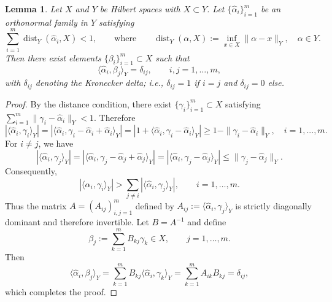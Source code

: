 \documentclass{article}
\numberwithin{equation}{section}
\newtheorem{lemma}{Lemma}[section]
\begin{document}
\begin{lemma}\label{lemma:orthocond}
Let $X$ and $Y$ be Hilbert spaces with $X\subset Y$. Let $\{\hat{\alpha}_i\}_{i=1}^m$ be an orthonormal family in $Y$ satisfying
\begin{equation}
\sum_{i=1}^m \operatorname{dist}_Y(\hat{\alpha}_i,X)<1,
\qquad\text{where}\qquad 
\operatorname{dist}_Y(\alpha,X):=\inf_{x\in X}\|\alpha-x\|_Y,\quad \alpha\in Y.
\end{equation}
Then there exist elements $\{\beta_i\}_{i=1}^m\subset X$ such that
\begin{equation}\label{equa:orthocod2}
\langle \hat{\alpha}_i,\beta_j\rangle_Y=\delta_{ij},\qquad i,j=1,\dots,m,
\end{equation}
with $\delta_{ij}$ denoting the Kronecker delta; i.e., $\delta_{ij}=1$ if $i=j$ and $\delta_{ij}=0$ else.
\end{lemma}

\begin{proof}
By the distance condition, there exist $\{\gamma_i\}_{i=1}^m\subset X$ satisfying $\sum_{i=1}^m\|\gamma_i-\hat{\alpha}_i\|_Y<1.$ Therefore
\begin{equation}
|\langle \hat{\alpha}_i,\gamma_i\rangle_Y|
=|\langle \hat{\alpha}_i,\gamma_i-\hat{\alpha}_i+\hat{\alpha}_i\rangle_Y|
=|1+\langle \hat{\alpha}_i,\gamma_i-\hat{\alpha}_i\rangle_Y|
\ge 1-\|\gamma_i-\hat{\alpha}_i\|_Y,\quad i=1,...,m.
\end{equation}
For $i\neq j$, we have
\begin{equation}
|\langle \hat{\alpha}_i,\gamma_j\rangle_Y|
=|\langle \hat{\alpha}_i,\gamma_j-\hat{\alpha}_j+\hat{\alpha}_j\rangle_Y|
=|\langle \hat{\alpha}_i,\gamma_j-\hat{\alpha}_j\rangle_Y|
\le \|\gamma_j-\hat{\alpha}_j\|_Y.
\end{equation}
Consequently,
\begin{equation}
|\langle \hat{\alpha}_i,\gamma_i\rangle_Y|
> \sum_{j\neq i}|\langle \hat{\alpha}_i,\gamma_j\rangle_Y|,\qquad i=1,\dots,m.
\end{equation}
Thus the matrix $A=(A_{ij})_{i,j=1}^m$ defined by $A_{ij}:=\langle \hat{\alpha}_i,\gamma_j\rangle_Y$ is strictly diagonally dominant and therefore invertible. Let $B=A^{-1}$ and define
\begin{equation}
\beta_j:=\sum_{k=1}^m B_{kj}\gamma_k\in X,\qquad j=1,\dots,m.
\end{equation}
Then
\begin{equation}
\langle \hat{\alpha}_i,\beta_j\rangle_Y
=\sum_{k=1}^m B_{kj}\langle \hat{\alpha}_i,\gamma_k\rangle_Y
=\sum_{k=1}^m A_{ik}B_{kj}
=\delta_{ij},
\end{equation}
which completes the proof.
\end{proof}
\end{document}

